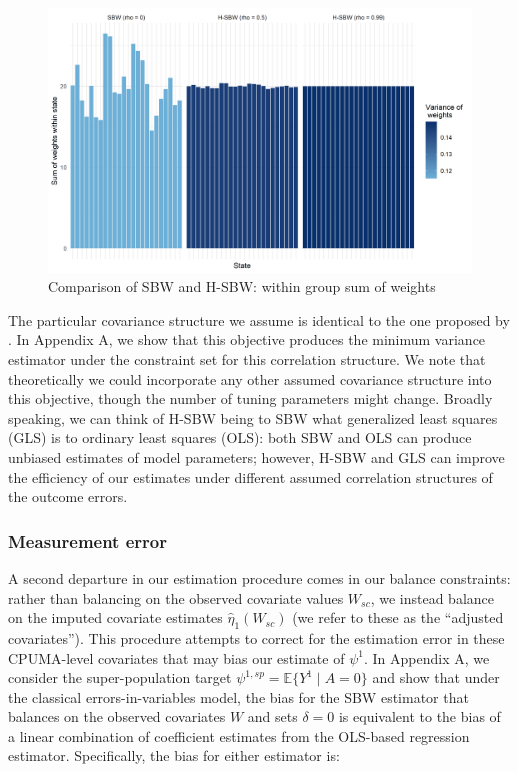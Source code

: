 \begin{figure}
\begin{center}
    \includegraphics[scale=0.5]{01_Plots/proofofconcept.png}
    \caption{Comparison of SBW and H-SBW: within group sum of weights}
    \label{oatepref}
\end{center}
\end{figure}

The particular covariance structure we assume is identical to the one proposed by \cite{kloek1981ols}. In Appendix A, we show that this objective produces the minimum variance estimator under the constraint set for this correlation structure. We note that theoretically we could incorporate any other assumed covariance structure into this objective, though the number of tuning parameters might change. Broadly speaking, we can think of H-SBW being to SBW what generalized least squares (GLS) is to ordinary least squares (OLS): both SBW and OLS can produce unbiased estimates of model parameters; however, H-SBW and GLS can improve the efficiency of our estimates under different assumed correlation structures of the outcome errors.

\subsubsection{Measurement error}

A second departure in our estimation procedure comes in our balance constraints: rather than balancing on the observed covariate values $W_{sc}$, we instead balance on the imputed covariate estimates $\hat{\eta}_1(W_{sc})$ (we refer to these as the ``adjusted covariates''). This procedure attempts to correct for the estimation error in these CPUMA-level covariates that may bias our estimate of $\psi^1$. In Appendix A, we consider the super-population target $\psi^{1, sp} = \mathbb{E}\{Y^1 \mid A = 0\}$ and show that under the classical errors-in-variables model, the bias for the SBW estimator that balances on the observed covariates $W$ and sets $\delta = 0$ is equivalent to the bias of a linear combination of coefficient estimates from the OLS-based regression estimator. Specifically, the bias for either estimator is:

